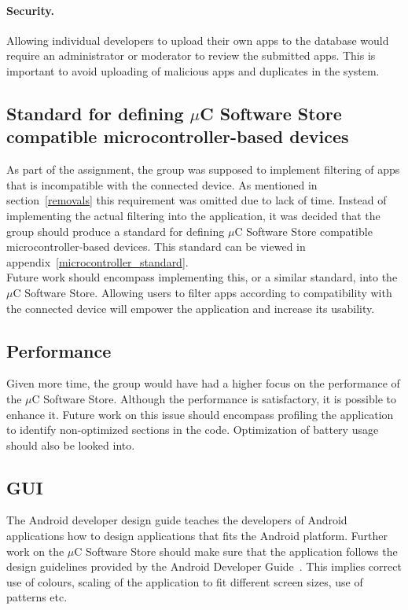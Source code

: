 	\paragraph{Security.} Allowing individual developers to upload their own apps to the database would require an administrator or moderator to review the submitted apps. This is important to avoid uploading of malicious apps and duplicates in the system.

	\subsection{Standard for defining $\mu$C Software Store compatible microcontroller-based devices}
	As part of the assignment, the group was supposed to implement filtering of apps that is incompatible with the connected device. As mentioned in section~\ref{removals} this requirement was omitted due to lack of time. Instead of implementing the actual filtering into the application, it was decided that the group should produce a standard for defining $\mu$C Software Store compatible microcontroller-based devices. This standard can be viewed in appendix~\ref{microcontroller_standard}. \\
	\newline
	Future work should encompass implementing this, or a similar standard, into the $\mu$C Software Store. Allowing users to filter apps according to compatibility with the connected device will empower the application and increase its usability.

	\subsection{Performance}
	Given more time, the group would have had a higher focus on the performance of the $\mu$C Software Store. Although the performance is satisfactory, it is possible to enhance it. Future work on this issue should encompass profiling the application to identify non-optimized sections in the code. Optimization of battery usage should also be looked into.

	\subsection{GUI}
	The Android developer design guide teaches the developers of Android applications how to design applications that fits the Android platform. Further work on the $\mu$C Software Store should make sure that the application follows the design guidelines provided by the Android Developer Guide~\cite{android-dev-guide}. This implies correct use of colours, scaling of the application to fit different screen sizes, use of patterns etc.

